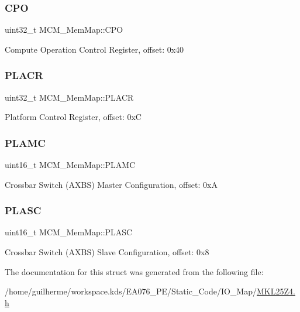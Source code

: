 \subsubsection{\texorpdfstring{C\+PO}{CPO}}
{\footnotesize\ttfamily uint32\+\_\+t M\+C\+M\+\_\+\+Mem\+Map\+::\+C\+PO}

Compute Operation Control Register, offset\+: 0x40 \mbox{\label{struct_m_c_m___mem_map_a520575ffc4561724479404679213900b}} 
\subsubsection{\texorpdfstring{P\+L\+A\+CR}{PLACR}}
{\footnotesize\ttfamily uint32\+\_\+t M\+C\+M\+\_\+\+Mem\+Map\+::\+P\+L\+A\+CR}

Platform Control Register, offset\+: 0xC \mbox{\label{struct_m_c_m___mem_map_a7d749b910777a6b67ea94f2379c628ee}} 
\subsubsection{\texorpdfstring{P\+L\+A\+MC}{PLAMC}}
{\footnotesize\ttfamily uint16\+\_\+t M\+C\+M\+\_\+\+Mem\+Map\+::\+P\+L\+A\+MC}

Crossbar Switch (A\+X\+BS) Master Configuration, offset\+: 0xA \mbox{\label{struct_m_c_m___mem_map_ad68f64d82524bb0b181a837967b8e248}} 
\subsubsection{\texorpdfstring{P\+L\+A\+SC}{PLASC}}
{\footnotesize\ttfamily uint16\+\_\+t M\+C\+M\+\_\+\+Mem\+Map\+::\+P\+L\+A\+SC}

Crossbar Switch (A\+X\+BS) Slave Configuration, offset\+: 0x8 

The documentation for this struct was generated from the following file\+:\begin{DoxyCompactItemize}
\item 
/home/guilherme/workspace.\+kds/\+E\+A076\+\_\+\+P\+E/\+Static\+\_\+\+Code/\+I\+O\+\_\+\+Map/\hyperlink{_m_k_l25_z4_8h}{M\+K\+L25\+Z4.\+h}\end{DoxyCompactItemize}
